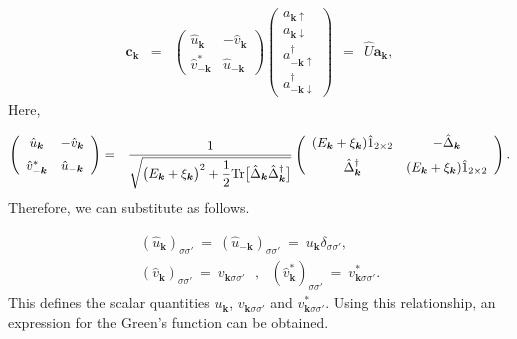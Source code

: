 \documentclass[uplatex,a4j,12pt,dvipdfmx]{jsarticle}
\begin{document}
\begin{eqnarray}
	\bm{c}_{\bm{k}}
	&=&
	\left(
	\begin{array}{cc}
			\hat{u}_{\bm{k}}       & - \hat{v}_{\bm{k}} \\[3mm]
			\hat{v}_{- \bm{k}}^{*} & \hat{u}_{- \bm{k}}
		\end{array}
	\right)
	\!\!\!
	\left(
	\begin{array}{c}
			a_{\bm{k} \uparrow}            \\[2mm]
			a_{\bm{k} \downarrow}          \\[2mm]
			a^{\dagger}_{-\bm{k} \uparrow} \\[2mm]
			a^{\dagger}_{-\bm{k} \downarrow}
		\end{array}
	\right)
	\ \ = \ \
	\hat{U}
	\bm{a}_{\bm{k}}
	,
\end{eqnarray}
%
Here,

\begin{eqnarray}
	\left(
	\begin{array}{cc}
			\hat{u}_{\bm{k}}       & - \hat{v}_{\bm{k}} \\[2mm]
			\hat{v}_{- \bm{k}}^{*} & \hat{u}_{-\bm{k}}
		\end{array}
	\right)
	&=&
	\dfrac{ 1 }{ \sqrt{ \big( E_{\bm{k}} + \xi_{\bm{k}} \big)^{2} + \dfrac{1}{2} {\rm Tr} \big[ \hat{\Delta}_{\bm{k}} \hat{\Delta}^{\dagger}_{\bm{k}} \big] } }
	\left(
	\begin{array}{cc}
			( E_{\bm{k}} + \xi_{\bm{k}} ) \hat{1}_{2 \times 2} & - \hat{\Delta}_{\bm{k}}                            \\[2mm]
			\hat{\Delta}_{\bm{k}}^{\dagger}                    & ( E_{\bm{k}} + \xi_{\bm{k}} ) \hat{1}_{2 \times 2}
		\end{array}
	\right)
	.
\end{eqnarray}
%
Therefore, we can substitute as follows.

\begin{eqnarray}
	( \hat{u}_{\bm{k}} )_{\sigma \sigma'}
	\ = \
	( \hat{u}_{- \bm{k}} )_{\sigma \sigma'}
	\ = \
	u_{\bm{k}} \delta_{\sigma \sigma'}
	,
	\\[2mm]
	( \hat{v}_{\bm{k}} )_{\sigma \sigma'}
	\ = \
	v_{\bm{k} \sigma \sigma'}
	\ \ \ , \ \ \
	( \hat{v}_{\bm{k}}^{*} )_{\sigma \sigma'}
	\ = \
	v_{\bm{k} \sigma \sigma'}^{*}
	.
\end{eqnarray}
%
This defines the scalar quantities $u_{\bm{k}}$, $v_{\bm{k} \sigma \sigma'}$ and $v_{\bm{k} \sigma \sigma'}^{*}$.
Using this relationship, an expression for the Green's function can be obtained.
\end{document}
